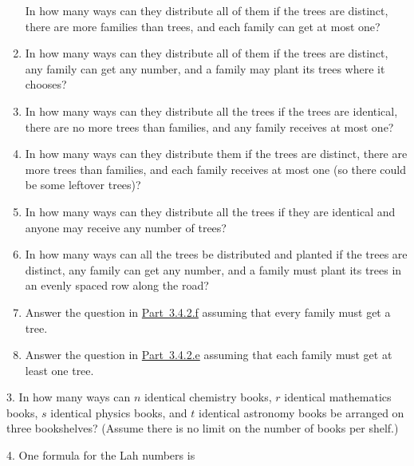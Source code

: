 \documentclass[10pt,]{book}
\theoremstyle{plain}
\theoremstyle{definition}
\theoremstyle{definition}
\numberwithin{equation}{chapter}
\newcommand{\importantarrow}{\Rightarrow}
\begin{document}
\begin{exerciselist}
\begin{enumerate}[label=(\alph*)]
In how many ways can they distribute all of them if the trees are distinct, there are more families than trees, and each family can get at most one?%
\item\hypertarget{li-54}{}\hypertarget{p-1008}{}%
In how many ways can they distribute all of them if the trees are distinct, any family can get any number, and a family may plant its trees where it chooses?%
\item\hypertarget{li-55}{}\hypertarget{p-1009}{}%
In how many ways can they distribute all the trees if the trees are identical, there are no more trees than families,   and any family receives at most one?%
\item\hypertarget{li-56}{}\hypertarget{p-1010}{}%
In how many ways can they distribute them if the trees are distinct, there are more trees than families, and each family receives at most one (so there could be some leftover trees)?%
\item\hypertarget{multisetproblem}{}\hypertarget{p-1011}{}%
In how many ways can they distribute all the trees if they are identical and anyone may receive any number of trees?%
\item\hypertarget{orderedfunctionproblem}{}\hypertarget{p-1012}{}%
In how many ways can all the trees be distributed and planted if the trees are distinct, any family can get any number, and a family must plant its trees in an evenly spaced row along the road?%
\item\hypertarget{li-59}{}\hypertarget{p-1013}{}%
Answer the question in \hyperlink{orderedfunctionproblem}{Part~3.4.2.f} assuming that every family must get a tree.%
\item\hypertarget{li-60}{}\hypertarget{p-1014}{}%
Answer the question in \hyperlink{multisetproblem}{Part~3.4.2.e} assuming that each family must get at least one tree.%
\end{enumerate}
%
\par\smallskip
\item[3.]\marginsymbol[-1em]{} \hypertarget{exercise-25}{}\hypertarget{p-1016}{}%
In how many ways can \(n\) identical chemistry books, \(r\) identical mathematics books, \(s\) identical physics books, and \(t\) identical astronomy books be arranged on three bookshelves?  (Assume there is no limit on the number of books per shelf.)%
\par\smallskip
\item[4.]\marginsymbol[-1em]{\pdftooltip{$\importantarrow$}{especially interesting}} \hypertarget{exercise-26}{}\hypertarget{p-1018}{}%
One formula for the Lah numbers is%

\end{exerciselist}
\end{document}
